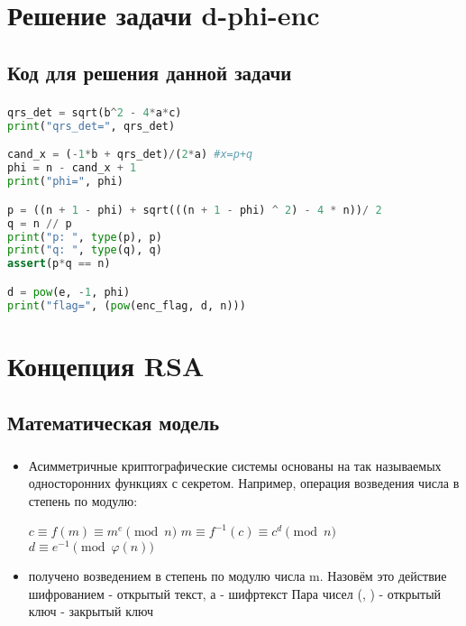 \documentclass[t]{beamer}
\begin{document}
\section{Решение задачи d-phi-enc}
\subsection{Код для решения данной задачи}
\begin{frame}[fragile]
	\frametitle{\insertsection} 
	\framesubtitle{\insertsubsection}
	\footnotesize
	\smaller
\begin{lstlisting}[language=Python]
qrs_det = sqrt(b^2 - 4*a*c)
print("qrs_det=", qrs_det)

cand_x = (-1*b + qrs_det)/(2*a) #x=p+q
phi = n - cand_x + 1
print("phi=", phi)

p = ((n + 1 - phi) + sqrt(((n + 1 - phi) ^ 2) - 4 * n))/ 2
q = n // p
print("p: ", type(p), p)
print("q: ", type(q), q)
assert(p*q == n)

d = pow(e, -1, phi)
print("flag=", (pow(enc_flag, d, n)))
\end{lstlisting}	
\end{frame}
\section{Концепция RSA}
\subsection{Математическая модель}

\begin{frame}[t] %
	\frametitle{\insertsection}
	\framesubtitle{\insertsubsection}
	\begin{itemize}
		\item<1-> Асимметричные криптографические системы основаны на так называемых односторонних функциях с секретом.\newline 
		Например, операция возведения числа в степень по модулю: \newline 
		\begin{center} \( c\equiv f(m) \equiv m^e \pmod{n} \) \newline
		\( m\equiv f^{-1}(c) \equiv c^d \pmod{n} \) \newline 
		\( d\equiv e^{-1} \pmod{\varphi(n)} \) \newline \end{center}
		\item<2->  получено возведением в степень по модулю числа m. Назовём это действие шифрованием
		\newline 
		 - открытый текст, а  - шифртекст
		\newline 
		Пара чисел (, ) - открытый ключ
		\newline
		 - закрытый ключ 
	\end{itemize}
\end{frame}
\end{document}
